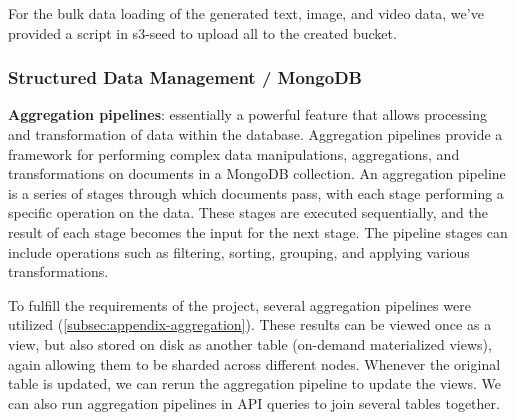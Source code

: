 \documentclass{report}
\begin{document}

    For the bulk data loading of the generated text, image, and video data, we've provided a script in s3-seed to upload all to the created bucket.

    \subsubsection{Structured Data Management / MongoDB}
    \textbf{Aggregation pipelines}: essentially a powerful feature that allows processing and transformation of data within the database. Aggregation pipelines provide a framework for performing complex data manipulations, aggregations, and transformations on documents in a MongoDB collection. An aggregation pipeline is a series of stages through which documents pass, with each stage performing a specific operation on the data. These stages are executed sequentially, and the result of each stage becomes the input for the next stage. The pipeline stages can include operations such as filtering, sorting, grouping, and applying various transformations.

    To fulfill the requirements of the project, several aggregation pipelines were utilized (\ref{subsec:appendix-aggregation}). These results can be viewed once as a view, but also stored on disk as another table (on-demand materialized views), again allowing them to be sharded across different nodes. Whenever the original table is updated, we can rerun the aggregation pipeline to update the views. We can also run aggregation pipelines in API queries to join several tables together.
\end{document}
